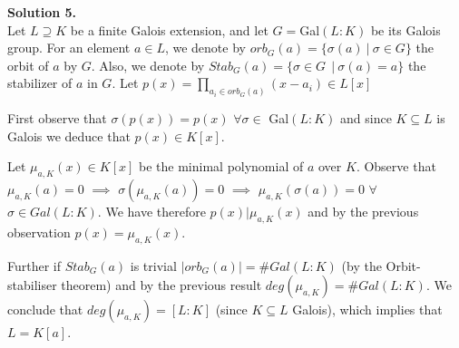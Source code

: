 \documentclass[12pt,a4paper]{article}
\begin{document}
\textbf{Solution 5.}\\
Let $L\supseteq K$ be a finite Galois extension, and let $G=$Gal$(L:K)$ be its Galois group. 
For an element $a\in L$, we denote by $orb_G(a)=\{\sigma(a) \ | \ \sigma \in G\}$ the orbit of $a$ by $G$. Also, we denote by $Stab_G(a)=\{\sigma \in G\ \ | \ \sigma(a)=a\}$ the stabilizer of $a$ in $G$. Let $p(x)= \prod_{a_i\in orb_G(a)} (x-a_i)\in L[x]$

First observe that $\sigma(p(x))=p(x)$ $\forall \sigma \in$  Gal$(L:K)$ and since $K\subseteq L$ is Galois we deduce that $p(x)\in K[x]$.

Let $\mu_{a,K}(x)\in K[x]$ be the minimal polynomial of $a$ over $K$. Observe that $\mu_{a,K}(a)=0$ $\implies$ $\sigma(\mu_{a,K}(a))=0$ $\implies$ $\mu_{a,K}(\sigma(a))=0$ $\forall$ $\sigma\in Gal(L:K)$. We have therefore $p(x)|\mu_{a,K}(x)$ and by the previous observation $p(x)=\mu_{a,K}(x)$.

Further if $Stab_G(a)$ is trivial $|orb_G(a)|=\#Gal(L:K)$ (by the Orbit-stabiliser theorem) and by the previous result $deg(\mu_{a,K})=\#Gal(L:K)$. We conclude that $deg(\mu_{a,K})=[L:K]$ (since $K\subseteq L$ Galois), which implies that $L=K[a]$.
\end{document}
